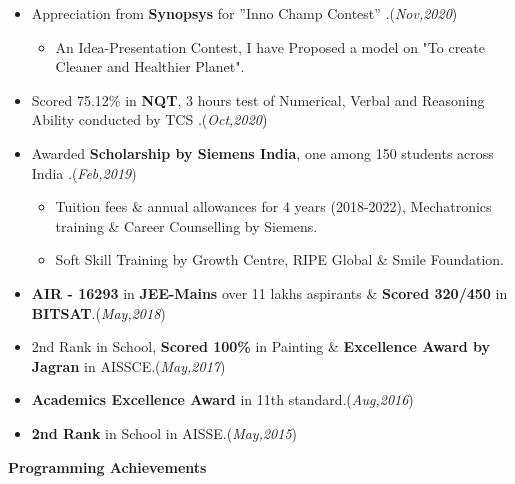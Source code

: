 \documentclass[10pt]{extarticle}
\begin{document}
    \begin{itemize}
       
        \item Appreciation from \textbf{Synopsys} for ”Inno Champ Contest” \href{https://drive.google.com/file/d/1Zv0M_kMdqlZwq2BzI__InScP3grGPLfp/view?usp=sharing}{\color{blue}\faArrowCircleRight}.\hfill\hfill(\textit{Nov,2020})
          \begin{itemize}
              \item An Idea-Presentation Contest, I have Proposed a model on "To create Cleaner and Healthier Planet".
          \end{itemize}
       \item Scored 75.12\% in \textbf{NQT}, 3 hours test of Numerical, Verbal and Reasoning Ability conducted by TCS \href{https://drive.google.com/file/d/1FfOOm94LawOPaGOGxPQHwiO4TyZkc5h6/view?usp=sharing}{\color{blue}\faArrowCircleRight}.\hfill\hfill(\textit{Oct,2020})
       \item Awarded \textbf{Scholarship by Siemens India}, one among 150 students across India \href{https://drive.google.com/file/d/1XFUYs_kH-7Q7BmaebOLJVNOLyD0d4iTg/view?usp=sharing}{\color{blue}\faArrowCircleRight}.\hfill\hfill(\textit{Feb,2019})
          \begin{itemize}
            \item Tuition fees \& annual allowances for 4 years (2018-2022), Mechatronics training \& Career Counselling by Siemens.
            \item Soft Skill Training by Growth Centre, RIPE Global \& Smile Foundation.
          \end{itemize}
      \item \textbf{AIR - 16293} in \textbf{JEE-Mains} over 11 lakhs aspirants \& \textbf{Scored 320/450} in \textbf{BITSAT}.\hfill\hfill(\textit{May,2018})
      \item 2nd Rank in School, \textbf{Scored 100\%} in Painting \& \textbf{Excellence Award by Jagran} in AISSCE.\hfill\hfill(\textit{May,2017})
      \item \textbf{Academics Excellence Award} in 11th standard.\hfill\hfill(\textit{Aug,2016})
      \item \textbf{2nd Rank} in School in AISSE.\hfill\hfill(\textit{May,2015})
    \end{itemize}
\vspace{3pt}
\textbf{Programming Achievements}
\end{document}
